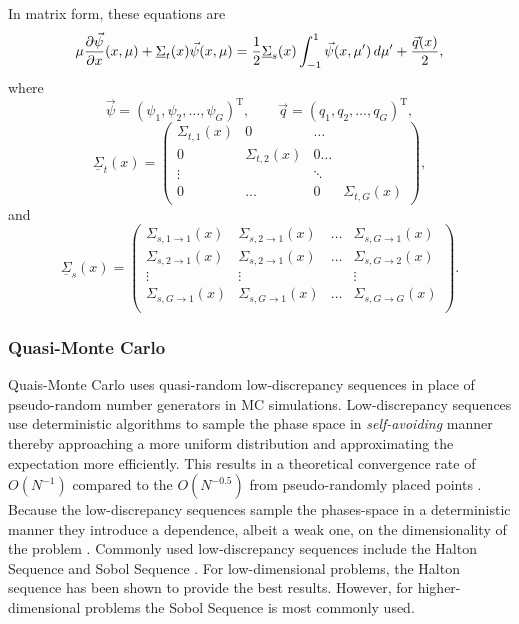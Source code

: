In matrix form, these equations are
\begin{equation}\label{eq:MGmat}
\mu  \frac{\partial \vec{\psi}}{\partial x} (x,\mu) + \underline{\Sigma}_{t}(x) \vec{\psi}(x,\mu) =
\frac{1}{2}  \underline{\Sigma}_{s}(x) \int_{-1}^1 \vec{\psi}(x, \mu') \, d\mu' + \frac{\vec{q}(x)}{2},
\end{equation}
where
\begin{equation}\label{eq:vecs}
\vec{\psi} = (\psi_1, \psi_2, \dots, \psi_G)^\mathrm{T}, \qquad \vec{q} = (q_1, q_2, \dots, q_G)^\mathrm{T}, 
\end{equation}
\begin{equation}\label{eq:MatricesT}
 \underline{\Sigma}_{t}(x)  = \begin{pmatrix} \Sigma_{t,1}(x) & 0 & \dots\\
 0 & \Sigma_{t,2}(x) & 0 \dots \\
 \vdots & & \ddots\\ 
 0 & \dots & 0 & \Sigma_{t,G}(x) 
 \end{pmatrix}, 
\end{equation}
and
\begin{equation}\label{eq:MatricesS}
 \underline{\Sigma}_{s}(x)  = \begin{pmatrix} \Sigma_{s,1\rightarrow 1}(x) & \Sigma_{s,2\rightarrow 1}(x)  & \dots & \Sigma_{s,G\rightarrow 1}(x) \\
 \Sigma_{s,2\rightarrow 1}(x) & \Sigma_{s,2\rightarrow 1}(x)  & \dots & \Sigma_{s,G\rightarrow 2}(x) \\
 \vdots & \vdots & & \vdots\\
 \Sigma_{s,G\rightarrow 1}(x) & \Sigma_{s,G\rightarrow 1}(x)  & \dots & \Sigma_{s,G\rightarrow G}(x) \\
 \end{pmatrix}.
\end{equation}

\subsubsection{Quasi-Monte Carlo}

Quais-Monte Carlo uses quasi-random low-discrepancy sequences in place of pseudo-random number generators in MC simulations. Low-discrepancy sequences use deterministic algorithms to sample the phase space in \textit{self-avoiding}  manner thereby approaching a more uniform distribution and approximating the expectation more efficiently. This results in a theoretical convergence rate of $O(N^{-1})$ compared to the $O(N^{-0.5})$ from pseudo-randomly placed points \cite{Palluotto2019}.  Because the low-discrepancy sequences sample the phases-space in a deterministic manner they introduce a dependence, albeit a weak one, on the dimensionality of the problem \cite{Hickernell2002}. Commonly used low-discrepancy sequences include the Halton Sequence and Sobol Sequence \cite{Niederreiter1992}. For low-dimensional problems, the Halton sequence has been shown to provide the best results. However, for higher-dimensional problems the Sobol Sequence is most commonly used.

